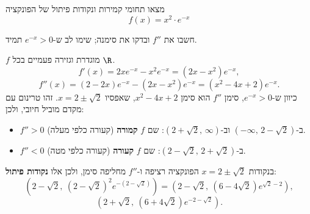 
\begin{question}
מצאו תחומי קמירות ונקודות פיתול של הפונקציה
\[ f(x)=x^2\cdot e^{-x} \]
\end{question}

\begin{hint}
חשבו את $f''$ ובדקו את סימנה; שימו לב ש-$e^{-x}>0$ תמיד.
\end{hint}

\begin{solution}
$f$ מוגדרת וגזירה פעמיים בכל $\R$.
\[ f'(x)=2xe^{-x}-x^2e^{-x}=(2x-x^2)e^{-x}, \]
\[ f''(x)=(2-2x)e^{-x}-(2x-x^2)e^{-x}=(x^2-4x+2)e^{-x}. \]
כיוון ש-$e^{-x}>0$, סימן $f''$ הוא סימן $x^2-4x+2$, שאפסיו $x=2\pm\sqrt2$. זהו טרינום עם מקדם מוביל חיובי, ולכן:
\begin{itemize}
  \item $f''>0$ ב-$(-\infty,\,2-\sqrt2)$ וב-$(2+\sqrt2,\,\infty)$: שם $f$ \textbf{קמורה} (קעורה כלפי מעלה).
  \item $f''<0$ ב-$(2-\sqrt2,\,2+\sqrt2)$: שם $f$ \textbf{קעורה} (קעורה כלפי מטה).
\end{itemize}
בנקודות $x=2\pm\sqrt2$ הפונקציה רציפה ו-$f''$ מחליפה סימן, ולכן אלו \textbf{נקודות פיתול}:
\[ \left(2-\sqrt2,\ (2-\sqrt2)^2e^{-(2-\sqrt2)}\right)=\left(2-\sqrt2,\ (6-4\sqrt2)e^{\sqrt2-2}\right), \]
\[ \left(2+\sqrt2,\ (6+4\sqrt2)e^{-2-\sqrt2}\right). \]
\end{solution}
